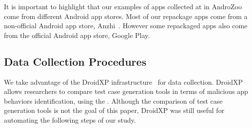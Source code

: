 It is important to highlight that our examples of apps collected at in AndroZoo come
from different Android app stores. Most of our repackage apps come from a non-official
Android app store, Anzhi~\cite{anzhi}. However some repackaged apps also come from the
official Android app store, Google Play.




\subsection{Data Collection Procedures} \label{sec:dataCollectionProc}

We take advantage of the DroidXP infrastructure~\cite{DBLP:conf/scam/CostaMCMVBC20}
for data collection. DroidXP allows researchers to compare 
test case generation tools in terms of malicious app behaviors identification, using the \mas. Although the comparison of test
case generation tools is not the goal of this paper, DroidXP
was still useful for automating the following steps of our study.


